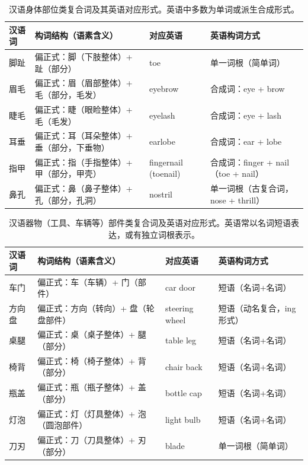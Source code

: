 \documentclass[10pt]{ctexart}
\begin{document}
\begin{enumerate}
    \begin{table}[H]
        \centering
        \renewcommand{\arraystretch}{1.25}
        \begin{tabularx}{\textwidth}{@{} l >{\raggedright\arraybackslash}X l >{\raggedright\arraybackslash}X @{}}
            \toprule
            \textbf{汉语词} & \textbf{构词结构（语素含义）} & \textbf{对应英语} & \textbf{英语构词方式} \\
            \midrule
            脚趾 & 偏正式：脚（下肢整体）+ 趾（部分） & toe & 单一词根（简单词） \\
            眉毛 & 偏正式：眉（眉部整体）+ 毛（部分，毛发） & eyebrow & 合成词：eye + brow \\
            睫毛 & 偏正式：睫（眼睑整体）+ 毛（毛发） & eyelash & 合成词：eye + lash \\
            耳垂 & 偏正式：耳（耳朵整体）+ 垂（部分，下垂物） & earlobe & 合成词：ear + lobe \\
            指甲 & 偏正式：指（手指整体）+ 甲（部分，甲壳） & fingernail (toenail) & 合成词：finger + nail（toe + nail） \\
            鼻孔 & 偏正式：鼻（鼻子整体）+ 孔（部分，孔洞） & nostril & 单一词根（古复合词，nose + thrill） \\
            \bottomrule
        \end{tabularx}
        \caption{汉语身体部位类复合词及其英语对应形式。英语中多数为单词或派生合成形式。}
    \end{table}

    \begin{table}[H]
        \centering
        \renewcommand{\arraystretch}{1.25}
        \begin{tabularx}{\textwidth}{@{} l >{\raggedright\arraybackslash}X l >{\raggedright\arraybackslash}X @{}}
            \toprule
            \textbf{汉语词} & \textbf{构词结构（语素含义）} & \textbf{对应英语} & \textbf{英语构词方式} \\
            \midrule
            车门 & 偏正式：车（车辆）+ 门（部件） & car door & 短语（名词+名词） \\
            方向盘 & 偏正式：方向（转向）+ 盘（轮盘部件） & steering wheel & 短语（动名复合，ing 形式） \\
            桌腿 & 偏正式：桌（桌子整体）+ 腿（部分） & table leg & 短语（名词+名词） \\
            椅背 & 偏正式：椅（椅子整体）+ 背（部分） & chair back & 短语（名词+名词） \\
            瓶盖 & 偏正式：瓶（瓶子整体）+ 盖（部分） & bottle cap & 短语（名词+名词） \\
            灯泡 & 偏正式：灯（灯具整体）+ 泡（圆泡部件） & light bulb & 短语（名词+名词） \\
            刀刃 & 偏正式：刀（刀具整体）+ 刃（部分） & blade & 单一词根（简单词） \\
            \bottomrule
        \end{tabularx}
        \caption{汉语器物（工具、车辆等）部件类复合词及英语对应形式。英语常以名词短语表达，或有独立词根表示。}
    \end{table}
\end{enumerate}
\end{document}
